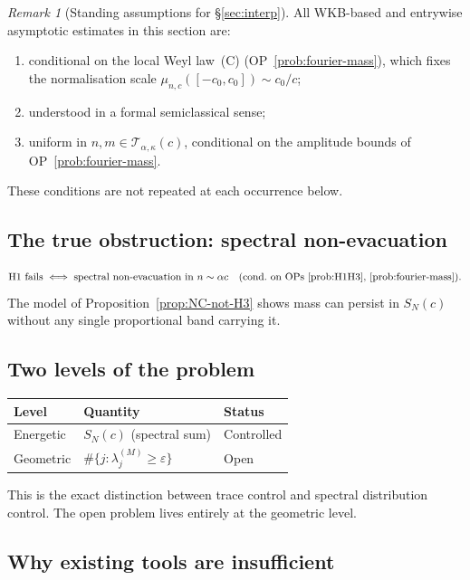 \documentclass[12pt,a4paper]{amsart}
\theoremstyle{definition}
\theoremstyle{remark}
\newtheorem*{remark*}{Remark}
\begin{document}
\begin{remark*}[Standing assumptions
  for \S\ref{sec:interp}]
\label{rem:standing}
All WKB-based and entrywise asymptotic
estimates in this section are:
\begin{enumerate}[\rm(i)]
\item conditional on the local Weyl
  law~\textup{(C)}
  (OP~\ref{prob:fourier-mass}),
  which fixes the normalisation scale
  $\mu_{n,c}([-c_0,c_0])\sim c_0/c$;
\item understood in a formal
  semiclassical sense;
\item uniform in
  $n,m\in\mathcal{T}_{\alpha,\kappa}(c)$,
  conditional on the amplitude bounds
  of OP~\ref{prob:fourier-mass}.
\end{enumerate}
These conditions are not repeated
at each occurrence below.
\end{remark*}

\subsection{The true obstruction:
  spectral non-evacuation}

\[
  \text{H1 fails}
  \;\Longleftrightarrow\;
  \text{spectral non-evacuation
  in }n\sim\alpha c
  \quad(\text{cond.\ on
  OPs~\ref{prob:H1H3},
  \ref{prob:fourier-mass}}).
\]
The model of
Proposition~\ref{prop:NC-not-H3}
shows mass can persist in $S_N(c)$
without any single proportional band
carrying it.

\subsection{Two levels of the problem}

\begin{center}
\renewcommand{\arraystretch}{1.15}
\begin{tabular}{lll}
\toprule
Level & Quantity & Status \\
\midrule
Energetic
  & $S_N(c)$ (spectral sum)
  & Controlled \\
Geometric
  & $\#\{j:\lambda_j^{(M)}\ge\varepsilon\}$
  & Open \\
\bottomrule
\end{tabular}
\end{center}

\noindent
This is the exact distinction between
trace control and spectral distribution
control.
The open problem lives entirely at
the geometric level.

\subsection{Why existing tools are
  insufficient}
\end{document}
